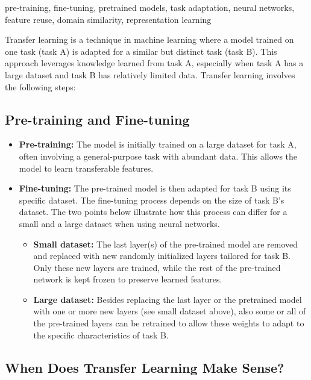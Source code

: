 \documentclass[12pt,openany, draft]{book}
\begin{document}
\begin{keywordsbox}
pre-training, fine-tuning, pretrained models, task adaptation, neural networks, feature reuse, domain similarity, representation learning
\end{keywordsbox}

Transfer learning is a technique in machine learning where a model trained on one task (task A) is adapted for a similar but distinct task (task B). This approach leverages knowledge learned from task A, especially when task A has a large dataset and task B has relatively limited data. Transfer learning involves the following steps:


\subsection{Pre-training and Fine-tuning}

\begin{itemize}
    \item \textbf{Pre-training:} The model is initially trained on a large dataset for task A, often involving a general-purpose task with abundant data. This allows the model to learn transferable features.
    \item \textbf{Fine-tuning:} The pre-trained model is then adapted for task B using its specific dataset. The fine-tuning process depends on the size of task B’s dataset. The two points below illustrate how this process can differ for a small and a large dataset when using neural networks.
    \begin{itemize}
        \item \textbf{Small dataset:} The last layer(s) of the pre-trained model are removed and replaced with new randomly initialized layers tailored for task B. Only these new layers are trained, while the rest of the pre-trained network is kept frozen to preserve learned features.
        \item \textbf{Large dataset:} Besides replacing the last layer or the pretrained model with one or more new layers (see small dataset above), also some or all of the pre-trained layers can be retrained to allow these weights to adapt to the specific characteristics of task B.
    \end{itemize}
\end{itemize}


\subsection{When Does Transfer Learning Make Sense?}
\end{document}
